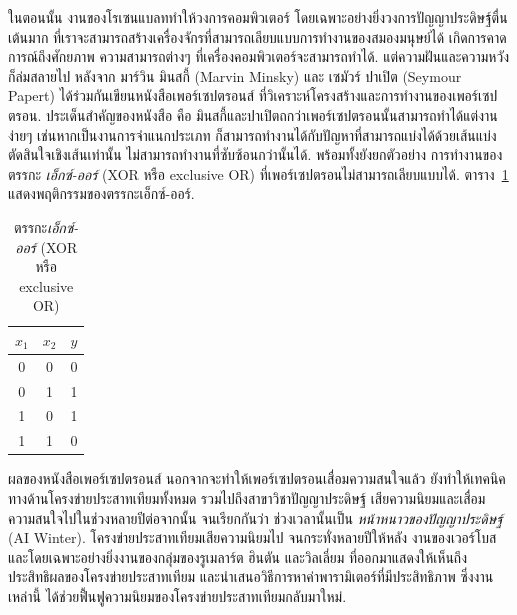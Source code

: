 %
%

ในตอนนั้น งานของโรเซนแบลททำให้วงการคอมพิวเตอร์ โดยเฉพาะอย่างยิ่งวงการปัญญาประดิษฐ์ตื่นเต้นมาก
ที่เราจะสามารถสร้างเครื่องจักรที่สามารถเลียบแบบการทำงานของสมองมนุษย์ได้
เกิดการคาดการณ์ถึงศักยภาพ ความสามารถต่างๆ ที่เครื่องคอมพิวเตอร์จะสามารถทำได้.
แต่ความฝันและความหวังก็ล่มสลายไป หลังจาก มาร์วิน มินสกี้ (Marvin Minsky) และ เซมัวร์ ปาเปิต (Seymour Papert) ได้ร่วมกันเขียนหนังสือเพอร์เซปตรอนส์\cite{MinskyPapert1969a} ที่วิเคราะห์โครงสร้างและการทำงานของเพอร์เซปตรอน.
ประเด็นสำคัญของหนังสือ คือ
มินสกี้และปาเปิตถกว่าเพอร์เซปตรอนนั้นสามารถทำได้แต่งานง่ายๆ 
เช่นหากเป็นงานการจำแนกประเภท ก็สามารถทำงานได้กับปัญหาที่สามารถแบ่งได้ด้วยเส้นแบ่งตัดสินใจเชิงเส้นเท่านั้น 
ไม่สามารถทำงานที่ซับซ้อนกว่านั้นได้.
พร้อมทั้งยังยกตัวอย่าง การทำงานของตรรกะ \textit{เอ็กซ์-ออร์} (XOR หรือ exclusive OR) ที่เพอร์เซปตรอนไม่สามารถเลียบแบบได้.
ตาราง~\ref{tbl: ANN XOR} แสดงพฤติกรรมของตรรกะเอ็กซ์-ออร์.

%
\begin{table}[hbtp]
\caption{ตรรกะ\textit{เอ็กซ์-ออร์} (XOR หรือ exclusive OR)}
\begin{center}
\begin{tabular}{|c|c|c|}
\hline 
$x_1$ & $x_2$ & $y$ \\
\hline
0     &    0  & 0   \\
0     &    1  & 1   \\
1     &    0  & 1   \\
1     &    1  & 0   \\
\hline
\end{tabular} 
\end{center}
\label{tbl: ANN XOR}
\end{table}


ผลของหนังสือเพอร์เซปตรอนส์ นอกจากจะทำให้เพอร์เซปตรอนเสื่อมความสนใจแล้ว 
ยังทำให้เทคนิคทางด้านโครงข่ายประสาทเทียมทั้งหมด รวมไปถึงสาขาวิชาปัญญาประดิษฐ์ 
เสียความนิยมและเสื่อมความสนใจไปในช่วงหลายปีต่อจากนั้น
จนเรียกกันว่า ช่วงเวลานั้นเป็น \textit{หน้าหนาวของปัญญาประดิษฐ์} (AI Winter).
โครงข่ายประสาทเทียมเสียความนิยมไป 
จนกระทั่งหลายปีให้หลัง งานของเวอร์โบส\cite{Werbos1974a}และโดยเฉพาะอย่างยิ่งงานของกลุ่มของรูเมลาร์ต ฮินตัน และวิลเลี่ยม\cite{RumelhartEtAl1986a} ที่ออกมาแสดงให้เห็นถึงประสิทธิผลของโครงข่ายประสาทเทียม 
และนำเสนอวิธีการหาค่าพารามิเตอร์ที่มีประสิทธิภาพ 
ซึ่งงานเหล่านี้ ได้ช่วยฟื้นฟูความนิยมของโครงข่ายประสาทเทียมกลับมาใหม่.

